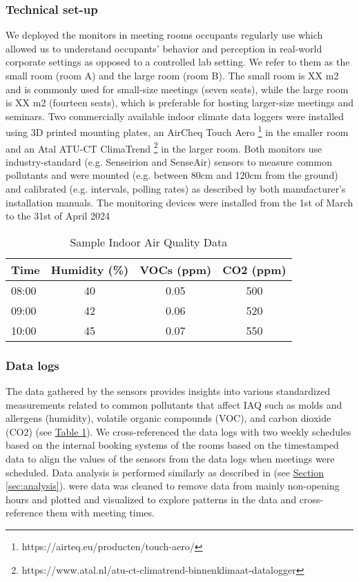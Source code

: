 \subsubsection{Technical set-up}

We deployed the monitors in meeting rooms occupants regularly use which allowed us to understand occupants' behavior and perception in real-world corporate settings as opposed to a controlled lab setting. We refer to them as the small room (room A) and the large room (room B). The small room is XX m2 and is commonly used for small-size meetings (seven seats), while the large room is XX m2 (fourteen seats), which is preferable for hosting larger-size meetings and seminars. Two commercially available indoor climate data loggers were installed using 3D printed mounting plates, an AirCheq Touch Aero \footnote{https://airteq.eu/producten/touch-aero/} in the smaller room and an Atal ATU-CT ClimaTrend \footnote{https://www.atal.nl/atu-ct-climatrend-binnenklimaat-datalogger} in the larger room. Both monitors use industry-standard (e.g. Senseirion and SenseAir) sensors to measure common pollutants and were mounted (e.g. between 80cm and 120cm from the ground) and calibrated (e.g. intervals, polling rates) as described by both manufacturer's installation manuals. The monitoring devices were installed from the 1st of March to the 31st of April 2024

\begin{table}[htbp]
    \centering
    \caption{Sample Indoor Air Quality Data}
    \begin{tabular}{lccc}
        \toprule
        \textbf{Time} & \textbf{Humidity (\%)} & \textbf{VOCs (ppm)} & \textbf{CO2 (ppm)} \\
        \midrule
        08:00 & 40 & 0.05 & 500 \\
        09:00 & 42 & 0.06 & 520 \\
        10:00 & 45 & 0.07 & 550 \\
        \bottomrule
    \end{tabular}
    \label{tab:air-quality}
\end{table}

\subsubsection{Data logs}

The data gathered by the sensors provides insights into various standardized measurements related to common pollutants that affect IAQ such as molds and allergens (humidity), volatile organic compounds (VOC), and carbon dioxide (CO2) (see \hyperref[tab:air-quality]{Table \ref*{tab:air-quality}}). We cross-referenced the data logs with two weekly schedules based on the internal booking systems of the rooms based on the timestamped data to align the values of the sensors from the data logs when meetings were scheduled. Data analysis is performed similarly as described in (see \hyperref[sec:analysis]{Section \ref*{sec:analysis}}). were data was cleaned to remove data from mainly non-opening hours and plotted and visualized to explore patterns in the data and cross-reference them with meeting times.



